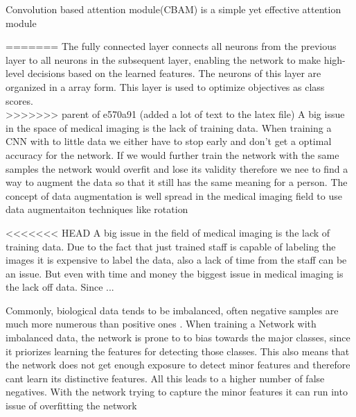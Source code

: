 \documentclass[
a4paper, 
12pt,
grayscalebody, %
abstract=on,
twoside, BCOR10mm, 12pt, DIV13,headinclude, footexclude, final, abstracton, openright
]{ibireprt}
\numberwithin{equation}{chapter}
\numberwithin{table}{chapter}
\numberwithin{figure}{chapter}
\numberwithin{algorithm}{chapter}
\numberwithin{example}{chapter}
\numberwithin{example}{chapter}
\begin{document}
Convolution based attention module(CBAM) is a simple yet effective attention module \cite{Woo2018}



=======
The fully connected layer connects all neurons from the previous layer to all neurons in the subsequent layer, enabling the network to make high-level decisions based on the learned features. The neurons of this layer are organized in a array form. This layer is used to optimize objectives as class scores.\\
>>>>>>> parent of e570a91 (added a lot of text to the latex file)
A big issue in the space of medical imaging is the lack of training data. When training a CNN with to little data we either have to stop early and don't get a optimal accuracy for the network. If we would further train the network with the same samples the network would overfit and lose its validity  
therefore we nee to find a way to augment the data so that it still has the same meaning for a person. The concept of data augmentation is well spread in the medical imaging field 
to use data augmentaiton techniques like rotation 

<<<<<<< HEAD
A big issue in the field of medical imaging is the lack of training data. Due to the fact that just trained staff is capable of labeling the images it is expensive to label the data, also a lack of time from the staff can be an issue. But even with time and money the biggest issue in medical imaging is the lack off data. Since ... %


 
 
 
 Commonly, biological data tends to be imbalanced, often negative samples are much more numerous than positive ones \cite{Alzubaidi2021}. When training a Network with imbalanced data, the network is prone to to bias towards the major classes, since it priorizes learning the features for detecting those classes. This also means that the network does not get enough exposure to detect minor features and therefore cant learn its distinctive features. All this leads to a higher number of false negatives. With the network trying to capture the minor features it can run into issue of overfitting the network %
 
\end{document}
